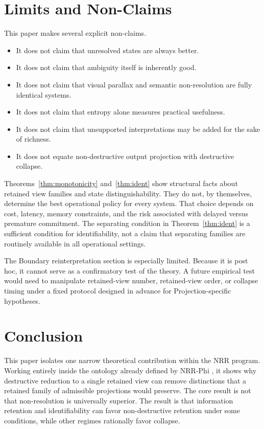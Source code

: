 \documentclass[11pt,a4paper]{article}
\begin{document}
\section{Limits and Non-Claims}
\label{sec:limits}

This paper makes several explicit non-claims.

\begin{itemize}
  \item It does not claim that unresolved states are always better.
  \item It does not claim that ambiguity itself is inherently good.
  \item It does not claim that visual parallax and semantic non-resolution are fully identical systems.
  \item It does not claim that entropy alone measures practical usefulness.
  \item It does not claim that unsupported interpretations may be added for the sake of richness.
  \item It does not equate non-destructive output projection with destructive collapse.
\end{itemize}

Theorems~\ref{thm:monotonicity} and~\ref{thm:ident} show structural facts about retained view families and state distinguishability. They do not, by themselves, determine the best operational policy for every system. That choice depends on cost, latency, memory constraints, and the risk associated with delayed versus premature commitment.
The separating condition in Theorem~\ref{thm:ident} is a sufficient condition for identifiability, not a claim that separating families are routinely available in all operational settings.

The Boundary reinterpretation section is especially limited. Because it is post hoc, it cannot serve as a confirmatory test of the theory. A future empirical test would need to manipulate retained-view number, retained-view order, or collapse timing under a fixed protocol designed in advance for Projection-specific hypotheses.

\section{Conclusion}
\label{sec:conclusion}

This paper isolates one narrow theoretical contribution within the NRR program. Working entirely inside the ontology already defined by NRR-Phi \cite{saito2026phi}, it shows why destructive reduction to a single retained view can remove distinctions that a retained family of admissible projections would preserve. The core result is not that non-resolution is universally superior. The result is that information retention and identifiability can favor non-destructive retention under some conditions, while other regimes rationally favor collapse.
\end{document}
